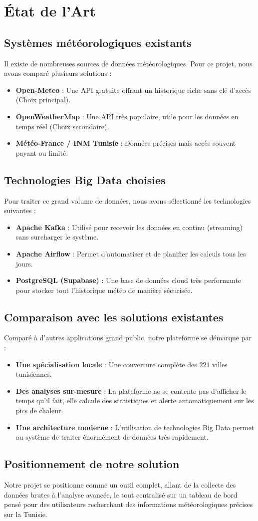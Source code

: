 \chapter{État de l'Art}

\section{Systèmes météorologiques existants}
Il existe de nombreuses sources de données météorologiques. Pour ce projet, nous avons comparé plusieurs solutions :
\begin{itemize}
    \item \textbf{Open-Meteo} : Une API gratuite offrant un historique riche sans clé d'accès (Choix principal).
    \item \textbf{OpenWeatherMap} : Une API très populaire, utile pour les données en temps réel (Choix secondaire).
    \item \textbf{Météo-France / INM Tunisie} : Données précises mais accès souvent payant ou limité.
\end{itemize}

\section{Technologies Big Data choisies}
Pour traiter ce grand volume de données, nous avons sélectionné les technologies suivantes :
\begin{itemize}
    \item \textbf{Apache Kafka} : Utilisé pour recevoir les données en continu (streaming) sans surcharger le système.
    \item \textbf{Apache Airflow} : Permet d'automatiser et de planifier les calculs tous les jours.
    \item \textbf{PostgreSQL (Supabase)} : Une base de données cloud très performante pour stocker tout l'historique météo de manière sécurisée.
\end{itemize}

\section{Comparaison avec les solutions existantes}
Comparé à d'autres applications grand public, notre plateforme se démarque par :
\begin{itemize}
    \item \textbf{Une spécialisation locale} : Une couverture complète des 221 villes tunisiennes.
    \item \textbf{Des analyses sur-mesure} : La plateforme ne se contente pas d'afficher le temps qu'il fait, elle calcule des statistiques et alerte automatiquement sur les pics de chaleur.
    \item \textbf{Une architecture moderne} : L'utilisation de technologies Big Data permet au système de traiter énormément de données très rapidement.
\end{itemize}

\section{Positionnement de notre solution}
Notre projet se positionne comme un outil complet, allant de la collecte des données brutes à l'analyse avancée, le tout centralisé sur un tableau de bord pensé pour des utilisateurs recherchant des informations météorologiques précises sur la Tunisie.
